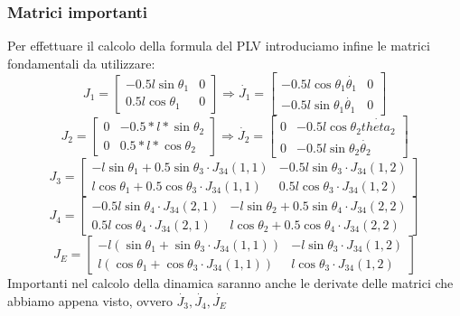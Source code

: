 \subsubsection{Matrici importanti}
Per effettuare il calcolo della formula del PLV introduciamo infine le matrici fondamentali da utilizzare:
\begin{equation*}
    J_1 = \begin{bmatrix}
     -0.5l\sin\theta_1 & 0 \\ 0.5l\cos\theta_1 & 0
    \end{bmatrix} \Rightarrow
    \dot{J_1} = \begin{bmatrix}
     -0.5l\cos\theta_1\dot{\theta_1} & 0 \\ -0.5l\sin\theta_1\dot{\theta_1} & 0
    \end{bmatrix}
\end{equation*}
\begin{equation*}
    J_2 = \begin{bmatrix}
           0 & -0.5*l*\sin\theta_2 \\
           0 & 0.5*l*\cos\theta_2 
           \end{bmatrix}
           \Rightarrow
   \dot{J_2} = \begin{bmatrix} 0 & -0.5l\cos\theta_2\dot{theta_2} \\
           0 & -0.5l\sin\theta_2\dot{\theta_2}
           \end{bmatrix}
\end{equation*}
\begin{equation*}
    J_3 = \begin{bmatrix}
    -l\sin\theta_1+0.5\sin\theta_3\cdot J_{34}(1,1) & 
    -0.5l\sin\theta_3\cdot J_{34}(1,2) \\
    l\cos\theta_1+0.5\cos\theta_3\cdot J_{34}(1,1) & 
    0.5l\cos\theta_3\cdot J_{34}(1,2)
    \end{bmatrix}
\end{equation*}
\begin{equation*}
    J_4 = \begin{bmatrix}
    -0.5l\sin\theta_4\cdot J_{34}(2,1) &
    -l\sin\theta_2+0.5\sin\theta_4\cdot J_{34}(2,2) \\
    0.5l\cos\theta_4\cdot J_{34}(2,1) &
    l\cos\theta_2+0.5\cos\theta_4\cdot J_{34}(2,2)
    \end{bmatrix}
\end{equation*}
\begin{equation*}
    J_E = \begin{bmatrix}
    -l(\sin\theta_1+\sin\theta_3\cdot J_{34}(1,1)) & 
    -l\sin\theta_3 \cdot J_{34}(1,2) \\
    l(\cos\theta_1+\cos\theta_3\cdot J_{34}(1,1)) &
    l\cos\theta_3 \cdot J_{34}(1,2)
    \end{bmatrix}
\end{equation*} 
Importanti nel calcolo della dinamica saranno anche le derivate delle matrici che abbiamo appena visto, ovvero $\dot{J_3}, \dot{J_4}, \dot{J_E}$
